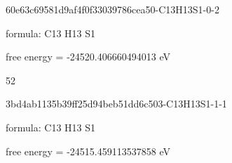 \documentclass{article}
\begin{document}
\vspace{1cm}


60e63c69581d9af4f0f33039786cea50-C13H13S1-0-2



formula: C13 H13 S1



free energy = -24520.406660494013 eV

52

\vspace{1cm}


3bd4ab1135b39ff25d94beb51dd6c503-C13H13S1-1-1



formula: C13 H13 S1



free energy = -24515.459113537858 eV
\end{document}
